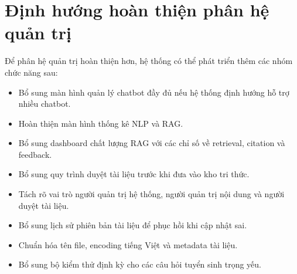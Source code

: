 \section{Định hướng hoàn thiện phân hệ quản trị}

Để phân hệ quản trị hoàn thiện hơn, hệ thống có thể phát triển thêm các nhóm chức năng sau:

\begin{itemize}
    \item Bổ sung màn hình quản lý chatbot đầy đủ nếu hệ thống định hướng hỗ trợ nhiều chatbot.
    \item Hoàn thiện màn hình thống kê NLP và RAG.
    \item Bổ sung dashboard chất lượng RAG với các chỉ số về retrieval, citation và feedback.
    \item Bổ sung quy trình duyệt tài liệu trước khi đưa vào kho tri thức.
    \item Tách rõ vai trò người quản trị hệ thống, người quản trị nội dung và người duyệt tài liệu.
    \item Bổ sung lịch sử phiên bản tài liệu để phục hồi khi cập nhật sai.
    \item Chuẩn hóa tên file, encoding tiếng Việt và metadata tài liệu.
    \item Bổ sung bộ kiểm thử định kỳ cho các câu hỏi tuyển sinh trọng yếu.
\end{itemize}
